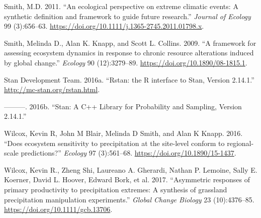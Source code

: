 \documentclass[fleqn,10pt,lineno]{wlpeerj} %
\begin{document}
\leavevmode\hypertarget{ref-Smith2011}{}%
Smith, M.D. 2011. ``An ecological perspective on extreme climatic
events: A synthetic definition and framework to guide future research.''
\emph{Journal of Ecology} 99 (3):656--63.
\url{https://doi.org/10.1111/j.1365-2745.2011.01798.x}.

\leavevmode\hypertarget{ref-Smith2009}{}%
Smith, Melinda D., Alan K. Knapp, and Scott L. Collins. 2009. ``A
framework for assessing ecosystem dynamics in response to chronic
resource alterations induced by global change.'' \emph{Ecology} 90
(12):3279--89. \url{https://doi.org/10.1890/08-1815.1}.

\leavevmode\hypertarget{ref-rstan2016}{}%
Stan Development Team. 2016a. ``Rstan: the R interface to Stan, Version
2.14.1.'' \url{http://mc-stan.org/rstan.html}.

\leavevmode\hypertarget{ref-stan2016}{}%
---------. 2016b. ``Stan: A C++ Library for Probability and Sampling,
Version 2.14.1.''

\leavevmode\hypertarget{ref-Wilcox2016}{}%
Wilcox, Kevin R, John M Blair, Melinda D Smith, and Alan K Knapp. 2016.
``Does ecosystem sensitivity to precipitation at the site-level conform
to regional-scale predictions?'' \emph{Ecology} 97 (3):561--68.
\url{https://doi.org/10.1890/15-1437}.

\leavevmode\hypertarget{ref-Wilcox2017}{}%
Wilcox, Kevin R., Zheng Shi, Laureano A. Gherardi, Nathan P. Lemoine,
Sally E. Koerner, David L. Hoover, Edward Bork, et al. 2017.
``Asymmetric responses of primary productivity to precipitation
extremes: A synthesis of grassland precipitation manipulation
experiments.'' \emph{Global Change Biology} 23 (10):4376--85.
\url{https://doi.org/10.1111/gcb.13706}.
\end{document}
